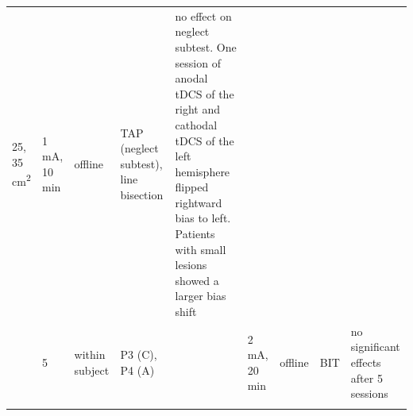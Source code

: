 \documentclass[11pt,]{memoir}
\begin{document}
\begin{longtable}[]{@{}lllllllll@{}}
\begin{minipage}[t]{0.04\columnwidth}
25,
35
cm\textsuperscript{2}\strut
\end{minipage} & \begin{minipage}[t]{0.04\columnwidth}\raggedright
1 mA,
10 min\strut
\end{minipage} & \begin{minipage}[t]{0.04\columnwidth}\raggedright
offline\strut
\end{minipage} & \begin{minipage}[t]{0.10\columnwidth}\raggedright
TAP (neglect
subtest), line
bisection\strut
\end{minipage} & \begin{minipage}[t]{0.28\columnwidth}\raggedright
no effect on neglect subtest. One session of anodal tDCS of
the right and cathodal tDCS of the left hemisphere flipped
rightward bias to left. Patients with small lesions showed a
larger bias shift\strut
\end{minipage}\tabularnewline
\begin{minipage}[t]{0.09\columnwidth}\raggedright
\textcite{Smit2015}\strut
\end{minipage} & \begin{minipage}[t]{0.02\columnwidth}\raggedright
5\strut
\end{minipage} & \begin{minipage}[t]{0.04\columnwidth}\raggedright
within
subject\strut
\end{minipage} & \begin{minipage}[t]{0.10\columnwidth}\raggedright
P3 (C), P4 (A)\strut
\end{minipage} & \begin{minipage}[t]{0.04\columnwidth}\raggedright
\strut
\end{minipage} & \begin{minipage}[t]{0.04\columnwidth}\raggedright
2 mA,
20 min\strut
\end{minipage} & \begin{minipage}[t]{0.04\columnwidth}\raggedright
offline\strut
\end{minipage} & \begin{minipage}[t]{0.10\columnwidth}\raggedright
BIT\strut
\end{minipage} & \begin{minipage}[t]{0.28\columnwidth}\raggedright
no significant effects after 5 sessions\strut
\end{minipage}\tabularnewline
\begin{minipage}[t]{0.09\columnwidth}\raggedright
\textcite{Ladavas2015}\strut

\end{minipage}
\end{longtable}
\end{document}
